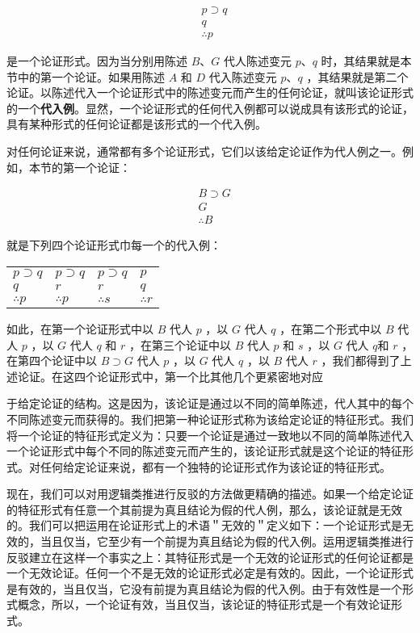 $$
\begin{aligned}
& p \supset q \\
& q \\
& \therefore p
\end{aligned}
$$

是一个论证形式。因为当分别用陈述 $B 、 G$ 代人陈述变元 $p 、 q$ 时，其结果就是本节中的第一个论证。如果用陈述 $A$ 和 $D$ 代入陈述变元 $p 、 q$ ，其结果就是第二个论证。以陈述代入一个论证形式中的陈述变元而产生的任何论证，就叫该论证形式的一个\textbf{代入例}。显然，一个论证形式的任何代入例都可以说成具有该形式的论证，具有某种形式的任何论证都是该形式的一个代入例。

对任何论证来说，通常都有多个论证形式，它们以该给定论证作为代人例之一。例如，本节的第一个论证：

$$
\begin{aligned}
& B \supset G \\
& G \\
& \therefore B
\end{aligned}
$$

就是下列四个论证形式巾每一个的代入例：

\begin{center}
\begin{tabular}{llll}
$p \supset q$ & $p \supset q$ & $p \supset q$ & $p$ \\
$q$ & $r$ & $r$ & $q$ \\
$\therefore p$ & $\therefore p$ & $\therefore s$ & $\therefore r$ \\
\end{tabular}
\end{center}

如此，在第一个论证形式中以 $B$ 代人 $p$ ，以 $G$ 代人 $q$ ，在第二个形式中以 $B$ 代人 $p$ ，以 $G$ 代人 $q$ 和 $r$ ，在第三个论证中以 $B$ 代人 $p$ 和 $s$ ，以 $G$ 代人 $q$和 $r$ ，在第四个论证中以 $B \supset G$ 代人 $p$ ，以 $G$ 代人 $q$ ，以 $B$ 代人 $r$ ，我们都得到了上述论证。在这四个论证形式中，第一个比其他几个更紧密地对应

于给定论证的结构。这是因为，该论证是通过以不同的简单陈述，代人其中的每个不同陈述变元而获得的。我们把第一种论证形式称为该给定论证的特征形式。我们将一个论证的特征形式定义为：只要一个论证是通过一致地以不同的简单陈述代入一个论证形式中每个不同的陈述变元而产生的，该论证形式就是这个论证的特征形式。对任何给定论证来说，都有一个独特的论证形式作为该论证的特征形式。

现在，我们可以对用逻辑类推进行反驳的方法做更精确的描述。如果一个给定论证的特征形式有任意一个其前提为真且结论为假的代人例，那么，该论证就是无效的。我们可以把运用在论证形式上的术语＂无效的＂定义如下：一个论证形式是无效的，当且仅当，它至少有一个前提为真且结论为假的代入例。运用逻辑类推进行反驳建立在这样一个事实之上：其特征形式是一个无效的论证形式的任何论证都是一个无效论证。任何一个不是无效的论证形式必定是有效的。因此，一个论证形式是有效的，当且仅当，它没有前提为真且结论为假的代入例。由于有效性是一个形式概念，所以，一个论证有效，当且仅当，该论证的特征形式是一个有效论证形式。

